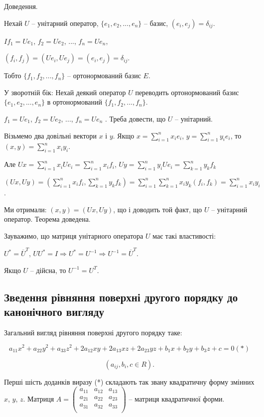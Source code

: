 Доведення.

Нехай $U$ -- унітарний оператор, $\{e_1, e_2, ..., e_n\}$ -- базис, $(e_i, e_j) = \delta_{ij}$.

$I f_1 = U e_1$, $f_2 = U e_2$, ..., $f_n = U e_n$,

$(f_i, f_j) = (U e_i, U e_j) = (e_i, e_j) = \delta_{ij}$.

Тобто $\{f_1, f_2, ..., f_n\}$ -- ортонормований базис $E$.

У зворотній бік: Нехай деякий оператор $U$ переводить
ортонормований базис $\{e_1, e_2, ..., e_n\}$ в ортонормований $\{f_1, f_2, ..., f_n\}$.

$f_1 = U e_1$, $f_2 = U e_2$, ..., $f_n = U e_n$ . Треба довести, що $U$ -- унітарний.

Візьмемо два довільні вектори $x$ і $y$. Якщо $x = \sum\limits_{i=1}^n x_i e_i$,
$y = \sum\limits_{i=1}^n y_i e_i$, то $(x,y) = \sum\limits_{i=1}^n x_i y_i$.

Але $U x = \sum\limits_{i=1}^n x_i U e_i = \sum\limits_{i=1}^n x_i f_i$,
$U y = \sum\limits_{i=1}^n y_i U e_i = \sum\limits_{k=1}^n y_k f_k$

$(U x, U y)
= \left( \sum\limits_{i=1}^n x_i f_i, \sum\limits_{k=1}^n y_k f_k \right)
= \sum\limits_{i=1}^n \sum\limits_{k=1}^n x_i y_k(f_i, f_k)
= \sum\limits_{i=1}^n x_i y_i$.

Ми отримали: $(x, y) = (U x, U y)$, що і доводить той факт, що $U$ -- унітарний
оператор. Теорема доведена.


Зауважимо, що матриця унітарного оператора $U$ має такі властивості:

$U^* = \overline{U}^T$, $U U^* = I \Rightarrow U^* = U^{-1} \Rightarrow U^{-1} = \overline{U}^T$. 

Якщо $U$ -- дійсна, то $U^{-1} = U^T$.

\subsection{Зведення рівняння поверхні другого порядку до канонічного вигляду}  %

Загальний вигляд рівняння поверхні другого порядку таке: 

$$a_{11} x^2 + a_{22} y^2 + a_{33} z^2 + 2 a_{12} x y + 2 a_{13} xz + 2 a_{23} yz + b_1 x + b_2 y + b_3 z + c = 0 (*)$$

$$(a_{ij}, b_i, c \in R).$$

Перші шість доданків виразу (*) складають так звану квадратичну форму
змінних $x$, $y$, $z$. Матриця $A = \begin{pmatrix}
	a_{11} & a_{12} & a_{13} \\
	a_{21} & a_{22} & a_{23} \\
	a_{31} & a_{32} & a_{33} \\
\end{pmatrix}$ -- матриця квадратичної форми.

